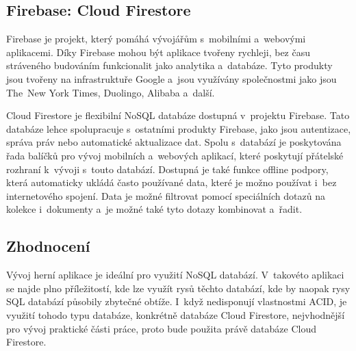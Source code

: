 \subsection{Firebase: Cloud Firestore}

Firebase je projekt,
který pomáhá vývojářům s~mobilními a~webovými aplikacemi.
Díky Firebase mohou být aplikace tvořeny rychleji,
bez času stráveného budováním funkcionalit jako analytika a~databáze.
Tyto produkty jsou tvořeny na infrastruktuře Google
a~jsou využívány společnostmi jako jsou The~New York Times,
Duolingo, Alibaba a~další.~\cite{firebase}

Cloud Firestore je flexibilní NoSQL databáze dostupná v~projektu Firebase.
Tato databáze lehce spolupracuje s~ostatními produkty Firebase,
jako jsou autentizace, správa práv nebo automatické aktualizace dat.
Spolu s~databází je poskytována řada balíčků pro vývoj mobilních a~webových
aplikací,
které poskytují přátelské rozhraní k~vývoji s~touto databází.
Dostupná je také funkce offline podpory,
která automaticky ukládá často používané data,
které je možno používat i~bez internetového spojení.
Data je možné filtrovat pomocí speciálních dotazů na kolekce i~dokumenty
a~je možné také tyto dotazy kombinovat a~řadit.~\cite{cloud_firestore}

\subsection{Zhodnocení}

Vývoj herní aplikace je ideální pro využití NoSQL databází.
V~takovéto aplikaci se najde plno příležitostí,
kde lze využít rysů těchto databází,
kde by naopak rysy SQL databází působily zbytečné obtíže.
I~když nedisponují vlastnostmi ACID,
je využití tohodo typu databáze,
konkrétně databáze Cloud Firestore,
nejvhodnější pro vývoj praktické části práce,
proto bude použita právě databáze Cloud Firestore.
